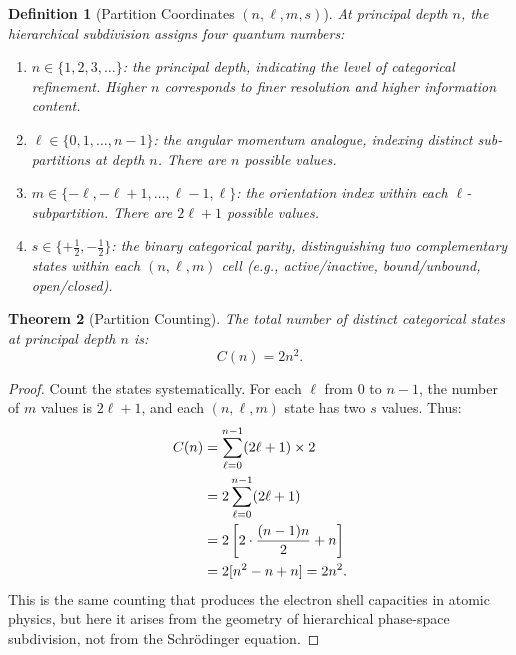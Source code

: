 \documentclass[11pt,twocolumn,a4paper]{article}
\newtheorem{theorem}{Theorem}[section]
\newtheorem{definition}[theorem]{Definition}
\begin{document}
\begin{definition}[Partition Coordinates $(n, \ell, m, s)$]
\label{def:partition-coords}
At principal depth $n$, the hierarchical subdivision assigns four
quantum numbers:
\begin{enumerate}[label=(\alph*),leftmargin=*]
\item $n \in \{1, 2, 3, \ldots\}$: the principal depth, indicating
  the level of categorical refinement. Higher $n$ corresponds to
  finer resolution and higher information content.
\item $\ell \in \{0, 1, \ldots, n-1\}$: the angular momentum
  analogue, indexing distinct sub-partitions at depth $n$. There are
  $n$ possible values.
\item $m \in \{-\ell, -\ell+1, \ldots, \ell-1, \ell\}$: the
  orientation index within each $\ell$-subpartition. There are
  $2\ell + 1$ possible values.
\item $s \in \{+\tfrac{1}{2}, -\tfrac{1}{2}\}$: the binary
  categorical parity, distinguishing two complementary states within
  each $(n,\ell,m)$ cell (e.g., active/inactive, bound/unbound,
  open/closed).
\end{enumerate}
\end{definition}

\begin{theorem}[Partition Counting]
\label{thm:partition-counting}
The total number of distinct categorical states at principal depth $n$
is:
\begin{equation}
C(n) = 2n^2.
\label{eq:partition-count}
\end{equation}
\end{theorem}

\begin{proof}
Count the states systematically. For each $\ell$ from $0$ to $n-1$,
the number of $m$ values is $2\ell + 1$, and each $(n,\ell,m)$ state
has two $s$ values. Thus:
\begin{align}
C(n) &= \sum_{\ell=0}^{n-1} (2\ell + 1) \times 2 \notag \\
     &= 2 \sum_{\ell=0}^{n-1} (2\ell + 1) \notag \\
     &= 2 \left[ 2 \cdot \frac{(n-1)n}{2} + n \right] \notag \\
     &= 2 [n^2 - n + n] = 2n^2.
\end{align}
This is the same counting that produces the electron shell capacities
in atomic physics, but here it arises from the geometry of hierarchical
phase-space subdivision, not from the Schr\"{o}dinger equation.
\end{proof}
\end{document}
